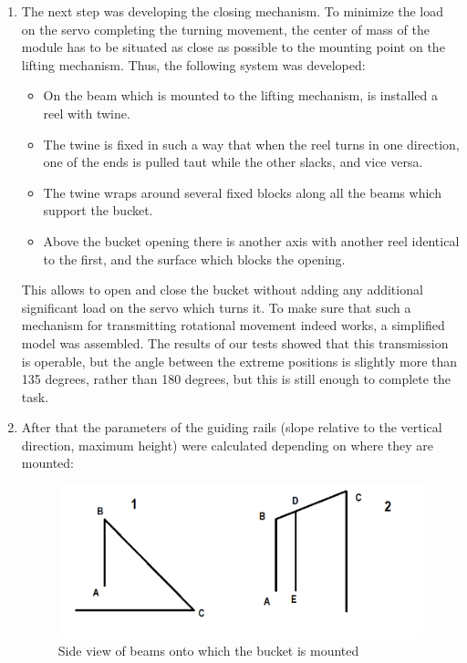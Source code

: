 \begin{enumerate}
  \item The next step was developing the closing mechanism. To minimize the load on the servo completing the turning movement, the center of mass of the module has to be situated as close as possible to the mounting point on the lifting mechanism. Thus, the following system was developed:
    \begin{itemize}
      \item On the beam which is mounted to the lifting mechanism, is installed a reel with twine.
      \item The twine is fixed in such a way that when the reel turns in one direction, one of the ends is pulled taut while the other  slacks, and vice versa.
      \item The twine wraps around several fixed blocks along all the beams which support the bucket.
      \item Above the bucket opening there is another axis with another reel identical to the first, and the surface which blocks the opening.
    \end{itemize} 
  This allows to open and close the bucket without adding any additional significant load on the servo which turns it. To make sure that such a mechanism for transmitting rotational movement indeed works, a simplified model was assembled. The results of our tests showed that this transmission is operable, but the angle between the extreme positions is slightly more than 135 degrees, rather than 180 degrees, but this is still enough to complete the task. 
  \item After that the parameters of the guiding rails (slope relative to the vertical direction, maximum height) were calculated depending on where they are mounted: 
  \begin{figure}[h]
  	\begin{minipage}[h]{1\linewidth}
  	    \includegraphics[scale = 0.4]{3Engineering/6Specifications_for_modules/bucket/images/01}
   	    \caption{Side view of beams onto which the bucket is mounted}
   	\end{minipage}
  \end{figure}	
  

\end{enumerate}
